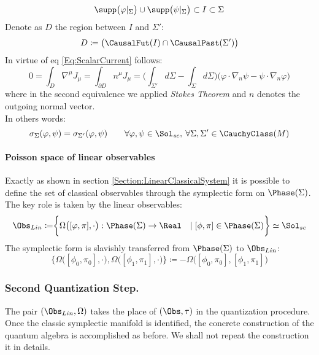 \documentclass[Main]{subfiles}
\begin{document}
\begin{example}
\begin{displaymath}
				\supp\big(\varphi \vert_\Sigma \big) \cup \supp\big( \psi \vert_\Sigma \big) \subset I \subset \Sigma
			\end{displaymath}
			Denote as $D$ the region between $I$ and $\Sigma'$:
			\begin{displaymath}
				D \coloneqq \big( \CausalFut(I) \cap \CausalPast(\Sigma') \big)
			\end{displaymath}
			In virtue of eq \ref{Eq:ScalarCurrent} follows:
			\begin{displaymath}
				0 = \int_{D} \nabla^\mu J_\mu = \int_{\partial D} n^\mu J_\mu = \big( \int_{\Sigma'} d\Sigma- \int_{\Sigma}d\Sigma \big) \big( \varphi \cdot \nabla_n \psi  - \psi \cdot \nabla_n \varphi \big) 
			\end{displaymath}
			where in the second equivalence we applied \emph{Stokes Theorem} and $n$ denotes the outgoing normal vector.
			\\
			In others words:
			\begin{displaymath}
				\sigma_\Sigma ( \varphi, \psi) = \sigma_{\Sigma'} (\varphi, \psi) 
				\qquad \forall \varphi, \psi \in \Sol_{sc},\: \forall \Sigma, \Sigma' \in \CauchyClass(M)
			\end{displaymath}
			
			
		\end{example}
			
		\paragraph{Poisson space of linear observables}		
		Exactly as shown in section \ref{Section:LinearClassicalSystem} it is possible to define the set of classical observables through the symplectic form on $\Phase(\Sigma)$.
		The key role is taken by the linear observables:
		\begin{displaymath}
			\Obs_{Lin} \coloneqq \biggr\{ \Omega\big( [\varphi, \pi], \cdot \big): \Phase(\Sigma) \rightarrow \Real \quad \vert\; [\phi,\pi]\in \Phase(\Sigma) \biggr\}	\simeq \Sol_{sc}
		\end{displaymath}
		The symplectic form is slavishly transferred from $\Phase(\Sigma)$ to $\Obs_{Lin}$:
		\begin{displaymath}
			\biggr\{ \Omega\big( [\phi_0,\pi_0], \cdot \big) , \Omega \big( [\phi_1,\pi_1], \cdot \big) \biggr\} \coloneqq
			- \Omega\big( [\phi_0, \pi_0], [\phi_1, \pi_1]\big)
		\end{displaymath}				
		
	\subsubsection{Second Quantization Step.}
		The pair $(\Obs_{Lin}, \Omega)$ takes the place of $(\Obs, \tau)$ in the quantization procedure.
		Once the classic symplectic manifold is identified, the concrete construction of the quantum algebra is accomplished as before. We shall not repeat the construction it in details.
		
\end{document}
